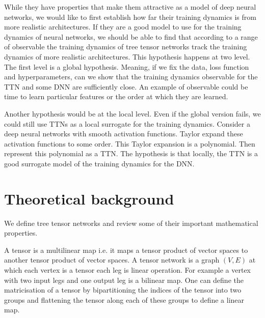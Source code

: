 \documentclass{article}
\theoremstyle{definition}
\begin{document}
While they have properties that make them attractive as a model of deep neural networks, we would like to first establish how far their training dynamics is from more realistic architectures. If they are a good model to use for the training dynamics of neural networks, we should be able to find that according to a range of observable the training dynamics of tree tensor networks track the training dynamics of more realistic architectures. This hypothesis happens at two level. The first level is a global hypothesis. Meaning, if we fix the data, loss function and hyperparameters, can we show that the training dynamics observable for the TTN and some DNN are sufficiently close. An example of observable could be time to learn particular features or the order at which they are learned. 

Another hypothesis would be at the local level. Even if the global version fails, we could still use TTNs as a local surrogate for the training dynamics. Consider a deep neural networks with smooth activation functions. Taylor expand these activation functions to some order. This Taylor expansion is a polynomial. Then represent this polynomial as a TTN. The hypothesis is that locally, the TTN is a good surrogate model of the training dynamics for the DNN.

\section{Theoretical background}
We define tree tensor networks and review some of their important mathematical properties. 

A tensor is a multilinear map i.e. it maps a tensor product of vector spaces to another tensor product of vector spaces. A tensor network is a graph $(V,E)$ at which each vertex is a tensor each leg is linear operation. For example a vertex with two input legs and one output leg is a bilinear map. One can define the matricisation of a tensor by bipartitioning the indices of the tensor into two groups and flattening the tensor along each of these groups to define a linear map. 
\end{document}
